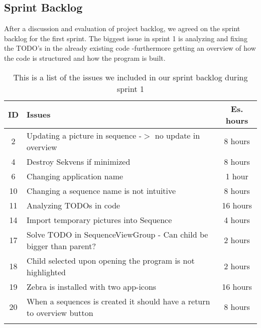 \subsection{Sprint Backlog}\label{subsec:spr1_sprblog}
After a discussion and evaluation of project backlog, we agreed on the sprint backlog for the first sprint. The biggest issue in sprint 1 is analyzing and fixing the TODO's in the already existing code -furthermore getting an overview of how the code is structured and how the program is built.
\begin{longtable} { | c | p{12cm} | c | } 
\hline
	ID 	&	Issues	&		 Es. hours \\\hline
	2	& 	Updating a picture in sequence -$>$ no update in overview	&	8 hours	\\\hline
	4	& 	Destroy Sekvens if minimized	&	8 hours	\\\hline
	6	& 	Changing application name	&	1 hour	\\\hline
	10	& 	Changing a sequence name is not intuitive	&	8 hours	\\\hline
	11	& 	Analyzing TODOs in code	&	16 hours	\\\hline
	14	& 	Import temporary pictures into Sequence	&	4 hours	\\\hline
	17	& 	Solve TODO in SequenceViewGroup - Can child be bigger than parent?	&	2 hours	\\\hline
	18	& 	Child selected upon opening the program is not highlighted	&	2 hours	\\\hline
	19	& 	Zebra is installed with two app-icons	&	16 hours	\\\hline
	20	& 	When a sequences is created it should have a return to overview button	&	8 hours	\\\hline
\caption{This is a list of the issues we included in our sprint backlog during sprint 1}
\label{tab:spr1_sprintblog}
\end{longtable}